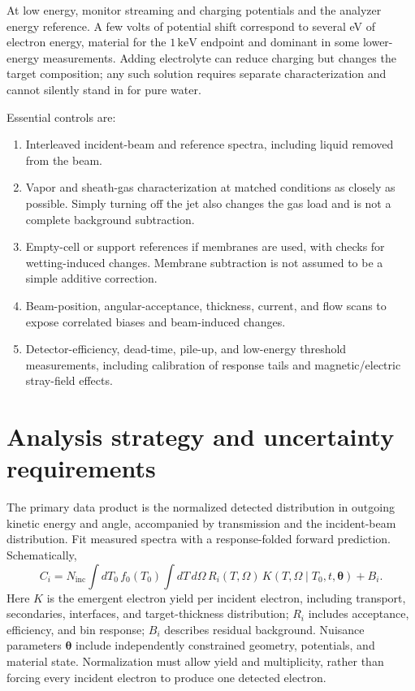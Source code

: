\documentclass[11pt,letterpaper]{article}
\newcommand{\keV}{\,\mathrm{keV}}
\begin{document}
At low energy, monitor streaming and charging potentials and the analyzer energy reference. A few
volts of potential shift correspond to several eV of electron energy, material for the $1\keV$
endpoint and dominant in some lower-energy measurements. Adding electrolyte can reduce charging
but changes the target composition; any such solution requires separate characterization and cannot
silently stand in for pure water.

Essential controls are:
\begin{enumerate}
  \item Interleaved incident-beam and reference spectra, including liquid removed from the beam.
  \item Vapor and sheath-gas characterization at matched conditions as closely as possible. Simply
    turning off the jet also changes the gas load and is not a complete background subtraction.
  \item Empty-cell or support references if membranes are used, with checks for wetting-induced
    changes. Membrane subtraction is not assumed to be a simple additive correction.
  \item Beam-position, angular-acceptance, thickness, current, and flow scans to expose correlated
    biases and beam-induced changes.
  \item Detector-efficiency, dead-time, pile-up, and low-energy threshold measurements, including
    calibration of response tails and magnetic/electric stray-field effects.
\end{enumerate}

\section{Analysis strategy and uncertainty requirements}

The primary data product is the normalized detected distribution in outgoing kinetic energy and
angle, accompanied by transmission and the incident-beam distribution. Fit measured spectra with a
response-folded forward prediction. Schematically,
\begin{equation}
  C_i = N_{\mathrm{inc}}\!\int dT_0\,f_0(T_0)
  \int dT\,d\Omega\, R_i(T,\Omega)\,
  K(T,\Omega\mid T_0,t,\boldsymbol{\theta})+B_i .
  \label{eq:forward}
\end{equation}
Here $K$ is the emergent electron yield per incident electron, including transport, secondaries,
interfaces, and target-thickness distribution; $R_i$ includes acceptance, efficiency, and bin response;
$B_i$ describes residual background. Nuisance parameters $\boldsymbol{\theta}$ include independently
constrained geometry, potentials, and material state. Normalization must allow yield and multiplicity,
rather than forcing every incident electron to produce one detected electron.
\end{document}
